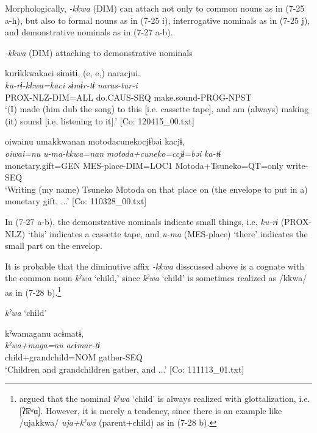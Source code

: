   Morphologically, \textit{{}-kkwa} (DIM) can attach not only to common nouns as in (7-25 a-h), but also to formal nouns as in (7-25 i), interrogative nominals as in (7-25 j), and demonstrative nominals as in (7-27 a-b).

\ea \label{ex:7:27}  \textit{{}-kkwa} (DIM) attaching to demonstrative nominals

\ea \label{ex:7:a}%
\glll  kurɨkkwakaci  sɨmɨtɨ,  (e, e,)  naracjui.\\
\textit{ku-rɨ-kkwa=kaci}  \textit{sɨmɨr-tɨ}    \textit{naras-tur-i}\\
PROX-NLZ-DIM=ALL  do.CAUS-SEQ    make.sound-PROG-NPST\\
\glt ‘(I) made (him dub the song) to this [i.e. cassette tape], and am (always) making (it) sound [i.e. listening to it].’ [Co: 120415\_00.txt]

\ex \label{ex:7:b}%
\glll  {\textbar}oiwai{\textbar}nu  umakkwanan  motodacunekocjɨbəi kacjɨ,    \\
\textit{oiwai=nu}  \textit{u-ma-kkwa=nan}  \textit{motoda+cuneko=ccjɨ=bəi}  \textit{ka-tɨ}\\
monetary.gift=GEN  MES-place-DIM=LOC1  Motoda+Tsuneko=QT=only       write-SEQ    \\
\glt ‘Writing (my name) Tsuneko Motoda on that place on (the envelope to put in a) monetary gift, ...’ [Co: 110328\_00.txt]
\z
\z

In (7-27 a-b), the demonstrative nominals indicate small things, i.e. \textit{ku-rɨ} (PROX-NLZ) ‘this’ indicates a cassette tape, and \textit{u-ma} (MES-place) ‘there’ indicates the small part on the envelop.

  It is probable that the diminutive affix \textit{{}-kkwa} disscussed above is a cognate with the common noun \textit{kˀwa} ‘child,’ since \textit{kˀwa} ‘child’ is sometimes realized as /kkwa/ as in (7-28 b).\footnote{\citet[39]{Niinaga2010} argued that the nominal \textit{kˀwa} ‘child’ is always realized with glottalization, i.e. [ʔ͡kʷɑ̟]. However, it is merely a tendency, since there is an example like /ujakkwa/ \textit{uja+kˀwa} (parent+child) as in (7-28 b).}

\ea \label{ex:7:28}  \textit{kˀwa} ‘child’

\ea \label{ex:7:a}%
\glll  kˀwamaganu  acɨmatɨ,\\
\textit{kˀwa+maga=nu}  \textit{acɨmar-tɨ}\\
child+grandchild=NOM  gather-SEQ\\
\glt ‘Children and grandchildren gather, and ...’ [Co: 111113\_01.txt]

